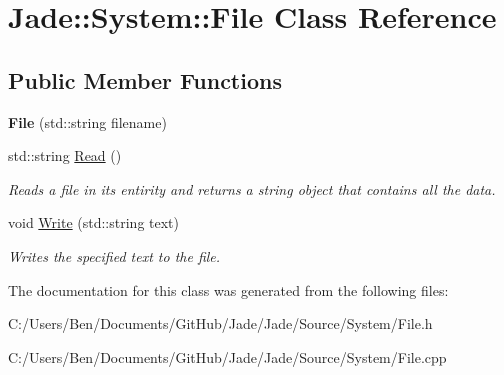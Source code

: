 \hypertarget{class_jade_1_1_system_1_1_file}{}\section{Jade\+:\+:System\+:\+:File Class Reference}
\label{class_jade_1_1_system_1_1_file}
\subsection*{Public Member Functions}
\begin{DoxyCompactItemize}
\item 
\hypertarget{class_jade_1_1_system_1_1_file_a01eddcc244a22eaa378143b391d86204}{}{\bfseries File} (std\+::string filename)\label{class_jade_1_1_system_1_1_file_a01eddcc244a22eaa378143b391d86204}

\item 
\hypertarget{class_jade_1_1_system_1_1_file_a9c33a1c82a59eecd7b9f046a2e8f6e3c}{}std\+::string \hyperlink{class_jade_1_1_system_1_1_file_a9c33a1c82a59eecd7b9f046a2e8f6e3c}{Read} ()\label{class_jade_1_1_system_1_1_file_a9c33a1c82a59eecd7b9f046a2e8f6e3c}

\begin{DoxyCompactList}\small\item\em Reads a file in its entirity and returns a string object that contains all the data. \end{DoxyCompactList}\item 
\hypertarget{class_jade_1_1_system_1_1_file_a899a6baf153ab70bc6d5f1bf000c3888}{}void \hyperlink{class_jade_1_1_system_1_1_file_a899a6baf153ab70bc6d5f1bf000c3888}{Write} (std\+::string text)\label{class_jade_1_1_system_1_1_file_a899a6baf153ab70bc6d5f1bf000c3888}

\begin{DoxyCompactList}\small\item\em Writes the specified text to the file. \end{DoxyCompactList}\end{DoxyCompactItemize}


The documentation for this class was generated from the following files\+:\begin{DoxyCompactItemize}
\item 
C\+:/\+Users/\+Ben/\+Documents/\+Git\+Hub/\+Jade/\+Jade/\+Source/\+System/File.\+h\item 
C\+:/\+Users/\+Ben/\+Documents/\+Git\+Hub/\+Jade/\+Jade/\+Source/\+System/File.\+cpp\end{DoxyCompactItemize}
